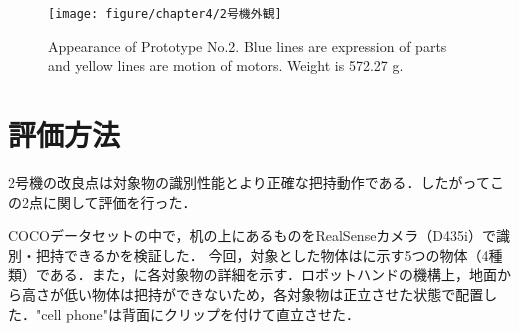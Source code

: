 \begin{figure}[H]
    \centering
    \texttt{[image: figure/chapter4/2号機外観]}
    \caption[Appearance of Prototype No.2]{Appearance of Prototype No.2. Blue lines are expression of parts and yellow lines are motion of motors. Weight is 572.27 g.}
    \label{fig:2号機外観}
\end{figure}


\section{評価方法}
2号機の改良点は対象物の識別性能とより正確な把持動作である．したがってこの2点に関して評価を行った．

COCOデータセットの中で，机の上にあるものをRealSenseカメラ（D435i）で識別・把持できるかを検証した．
今回，対象とした物体はに示す5つの物体（4種類）である．また，に各対象物の詳細を示す．ロボットハンドの機構上，地面から高さが低い物体は把持ができないため，各対象物は正立させた状態で配置した．"cell phone"は背面にクリップを付けて直立させた．

